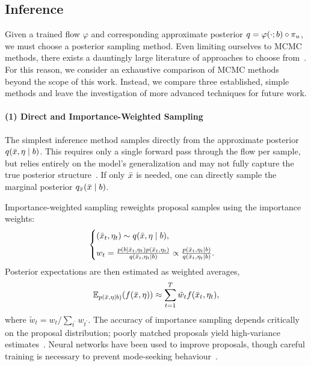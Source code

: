 \subsection{Inference}

Given a trained flow $\varphi$ and corresponding approximate posterior $q = \varphi(\cdot; b) \circ \pi_{u}$, we must choose a posterior sampling method.
Even limiting ourselves to \gls*{MCMC} methods, there exists a dauntingly large literature of approaches to choose from~\citep{brooks_handbook_2011}.
For this reason, we consider an exhaustive comparison of \gls*{MCMC} methods beyond the scope of this work.
Instead, we compare three established, simple methods and leave the investigation of more advanced techniques for future work.

\paragraph*{(1) Direct and Importance-Weighted Sampling}

The simplest inference method samples directly from the approximate posterior $q(\bar{x}, \eta \mid b)$.
This requires only a single forward pass through the flow per sample, but relies entirely on the model's generalization and may not fully capture the true posterior structure~\citep{dax_neural_2023}.
If only $\bar{x}$ is needed, one can directly sample the marginal posterior $q_{\bar{x}}(\bar{x} \mid b)$.

Importance-weighted sampling reweights proposal samples using the importance weights:
\begin{align}\label{eqn:importance_sampling}
    \begin{cases}
        (\bar{x}_{t}, \eta_{t}) \sim q(\bar{x}, \eta \mid b), \\[6pt]
        w_{t} = \frac{p(b \mid \bar{x}_{t}, \eta_{t}) p(\bar{x}_{t}, \eta_{t})}{q(\bar{x}_{t}, \eta_{t} \mid b)} \propto \frac{p(\bar{x}_{t}, \eta_{t} \mid b)}{q(\bar{x}_{t}, \eta_{t} \mid b)}.
    \end{cases}
\end{align}
Posterior expectations are then estimated as weighted averages,
\begin{align}\label{eqn:importance_sampling_expectation}
    \mathbb{E}_{p(\bar{x}, \eta \mid b)}(f(\bar{x}, \eta)) \approx \sum_{t=1}^T \tilde{w}_{t} f(\bar{x}_{t}, \eta_{t}),
\end{align}
where $\tilde{w}_{t} = w_{t}/\sum_{t^\prime} w_{t^\prime}$.
The accuracy of importance sampling depends critically on the proposal distribution;
poorly matched proposals yield high-variance estimates~\citep{domke_importance_2018,muller_neural_2019}.
Neural networks have been used to improve proposals, though careful training is necessary to prevent mode-seeking behaviour~\citep{midgley_flow_2023}.

